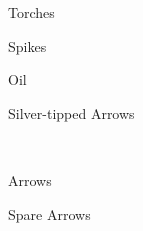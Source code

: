 \documentclass[11pt]{article}
\begin{document}
\\
\begin{minipage}[t]{\textwidth}
\vspace{0.6cm}
{\huge \textbf{}}\\
\Large{\textcolor{OCRA}{Torches}}\\
\end{minipage}
\begin{minipage}[t]{.45\textwidth}
\vspace{0.3cm}
\Large{\textcolor{OCRA}{Spikes}}\\
\end{minipage}
\begin{minipage}[t]{.2\textwidth}
\vspace{0.3cm}
\Large{\textcolor{OCRA}{Oil}}\\
\end{minipage}
\begin{minipage}[t]{.3\textwidth}
\vspace{0.3cm}
\Large{\textcolor{OCRA}{Silver-tipped Arrows}}\\
\end{minipage}\\
\begin{minipage}[t]{\textwidth}
\vspace{0.3cm}
\Large{\textcolor{OCRA}{Arrows}}\\
\end{minipage}
\begin{minipage}[t]{\textwidth}
\vspace{0.3cm}
\Large{\textcolor{OCRA}{Spare Arrows}}\\
\end{minipage}
\newpage
\hspace{0.04\textwidth}
\end{document}
